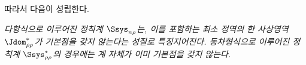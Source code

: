 
따라서 다음이 성립한다.

\emph{다항식으로 이루어진 정칙계 $\Ssys_{n\rho}$는, 이를 포함하는 최소 정역의 한 사상영역 $\Jdom^*_{\rho\rho}$가 기본점을 갖지 않는다는 성질로 특징지어진다. 동차형식으로 이루어진 정칙계 $\Ssys^*_{\rho\rho}$의 경우에는 계 자체가 이미 기본점을 갖지 않는다.}
